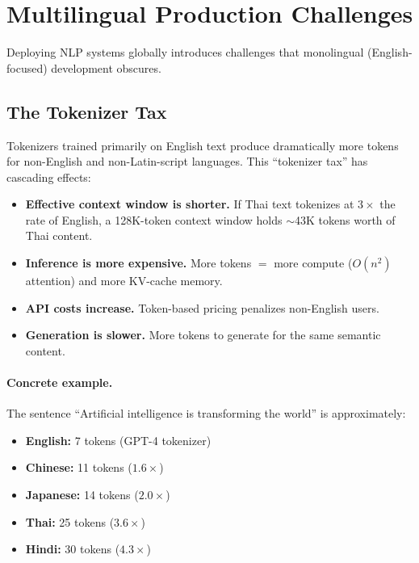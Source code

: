 \section{Multilingual Production Challenges}
\label{sec:multilingual_production}

Deploying NLP systems globally introduces challenges that monolingual (English-focused)
development obscures.

\subsection{The Tokenizer Tax}
\label{sec:tokenizer_tax}

Tokenizers trained primarily on English text produce dramatically more tokens for
non-English and non-Latin-script languages.  This ``tokenizer tax'' has cascading
effects:

\begin{itemize}
    \item \textbf{Effective context window is shorter.}  If Thai text tokenizes at
          $3\times$ the rate of English, a 128K-token context window holds
          $\sim$43K tokens worth of Thai content.
    \item \textbf{Inference is more expensive.}  More tokens $=$ more compute
          ($O(n^2)$ attention) and more KV-cache memory.
    \item \textbf{API costs increase.}  Token-based pricing penalizes non-English users.
    \item \textbf{Generation is slower.}  More tokens to generate for the same semantic
          content.
\end{itemize}

\paragraph{Concrete example.}
The sentence ``Artificial intelligence is transforming the world'' is approximately:
\begin{itemize}
    \item \textbf{English:} 7 tokens (GPT-4 tokenizer)
    \item \textbf{Chinese:} 11 tokens ($1.6\times$)
    \item \textbf{Japanese:} 14 tokens ($2.0\times$)
    \item \textbf{Thai:} 25 tokens ($3.6\times$)
    \item \textbf{Hindi:} 30 tokens ($4.3\times$)
\end{itemize}

